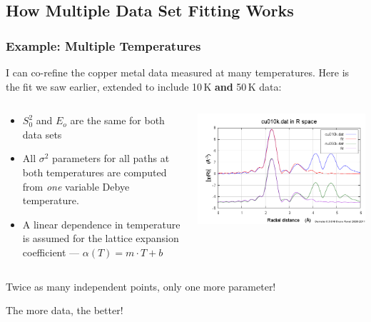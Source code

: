 \documentclass[10pt, xcolor=x11names, compress]{beamer}
\begin{document}
\subsection[Explain]{How Multiple Data Set Fitting Works}
\begin{frame}
  \frametitle{Example: Multiple Temperatures}

  I can co-refine the {\color{Green4}copper metal} data measured at
  many temperatures.  Here is the fit we saw earlier, extended to
  include 10\,K \textbf{and} 50\,K data:
  \begin{columns}
    \begin{column}{0.55\linewidth}
      \begin{itemize}
      \item $S_0^2$ and $E_o$ are the same for both data sets
      \item All $\sigma^2$ parameters for all paths at both
        temperatures are computed from \textit{one} variable Debye
        temperature.
      \item A linear dependence in temperature is assumed for the
        lattice expansion coefficient --- $\alpha(T) = m\cdot T+b$
      \end{itemize}
    \end{column}
    \begin{column}{0.45\linewidth}
      \includegraphics[width=\linewidth]{mds/cu10_150.png}
    \end{column}
  \end{columns}
  \begin{exampleblock}{}
    \begin{center}
      Twice as many independent points, only one more parameter!

      The more data, the better!
    \end{center}
  \end{exampleblock}
\end{frame}
\end{document}
